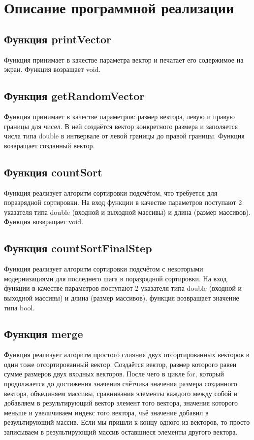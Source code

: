 \documentclass{article}
\begin{document}
\newpage
\section{Описание программной реализации}

\subsection{Функция printVector} 
Функция принимает в качестве параметра вектор и печатает его содержимое на экран. Функция возращает void.

\subsection{Функция getRandomVector} 
Функция принимает в качестве параметров: размер вектора, левую и правую границы для чисел. В ней создаётся вектор конкретного размера и заполяется числа типа double в интвервале от левой границы до правой границы. Функция возвращает созданный вектор.

\subsection{Функция countSort} 
Функция реализует алгоритм сортировки подсчётом, что требуется для поразрядной сортировки. На вход функции в качестве параметров поступают 2 указателя типа double (входной и выходной массивы) и длина (размер массивов).
Функция возвращает void.

\subsection{Функция countSortFinalStep} 
Функция реализует алгоритм сортировки подсчётом с некоторыми модернизациями для последнего шага в поразрядной сортировки. На вход функции в качестве параметров поступают 2 указателя типа double (входной и выходной массивы) и длина (размер массивов). функция возвращает значение типа bool.

\subsection{Функция merge}
Функция реализует алгоритм простого слияния двух отсортированных векторов в один тоже отсортированный вектор.
Создаётся вектор, размер которого равен сумме размеров двух входных векторов.
После чего в цикле for, который продолжается до достижения значения счётчика значения размера созданного вектора, объединяем массивы, сравнивания элементы каждого между собой и добавляем в результирующий вектор элемент того вектора, значения которого меньше и увеличиваем индекс того вектора, чьё значение добавил в результирующий массив. Если мы пришли к концу одного из векторов, то просто записываем в результирующий массив оставшиеся элементы другого вектора.
\end{document}
